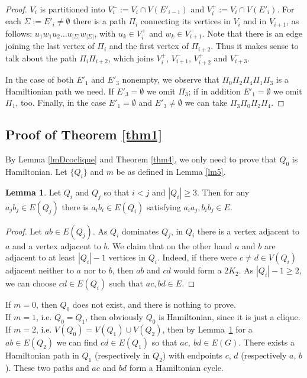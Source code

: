 \documentclass{amsart}
\theoremstyle{definition}
\newtheorem{lemma}{Lemma}
\begin{document}
\begin{proof}
$V_i$ is partitioned into
$V_i^-:= V_i\cap V(E'_{i-1})$ and 
$V_i^+:= V_i\cap V(E'_{i})$. For each $\Sigma:=E'_i\neq\emptyset$ there is
a path $\Pi_i$ connecting its vertices in $V_i$ and in $V_{i+1}$, 
as follows: $u_1 w_1 u_2\dots u_{|\Sigma|}w_{|\Sigma|}$, with 
$u_k\in V_i^+$ and $w_k\in V_{i+1}^-$.%
Note that there is an edge joining the last vertex of $\Pi_i$ and
the first vertex of $\Pi_{i+2}$. Thus it makes sense to talk about the path
$\Pi_i\Pi_{i+2}$, which joins $V_i^+$, $V_{i+1}^-$, $V_{i+2}^+$ and
$V_{i+3}^-$.

In the case of both $E'_1$ and $E'_3$ nonempty, we observe that 
$\Pi_0\Pi_2\Pi_4\Pi_1\Pi_3$ is a Hamiltionian path we need.
If $E'_3=\emptyset$  we omit $\Pi_3$; if in addition $E'_1=\emptyset$ 
we omit $\Pi_1$, too. Finally, in the case  $E'_1=\emptyset$ and 
$E'_3\neq\emptyset$ we can take $\Pi_3\Pi_0\Pi_2\Pi_4$.
\end{proof}

\subsection{Proof of Theorem \ref{thm1}}
By Lemma \ref{lmDcoclique} and Theorem \ref{thm4}, we only need to prove that $Q_0$ is Hamiltonian.
Let $\{Q_i\}$ and $m$ be as defined in Lemma \ref{lm5}.
\begin{lemma}\label{lem:twoQ}
Let $Q_i$ and $Q_j$ so that $i<j$ and $|Q_i|\geq 3$.
Then for any $a_j b_j\in E(Q_j)$  there is $a_i b_i\in E(Q_i)$ satisfying
$a_i a_j, b_i b_j\in E$.
\end{lemma}
\begin{proof}
Let $ab\in E(Q_j)$. As $Q_i$ dominates $Q_j$, in $Q_i$ there is a vertex adjacent to 
$a$ and a vertex adjacent to $b$.
We claim that on the other hand $a$ and $b$ are adjacent to at least $|Q_i|-1$ vertices in $Q_i$. 
Indeed, if there were $c\neq d\in V(Q_i)$ adjacent neither to $a$ nor to $b$, 
then $ab$ and $cd$ would form a $2K_2$.
As $|Q_i|-1\ge 2$, we can choose $cd\in E(Q_i)$ such that $ac, bd\in E$.
\end{proof}
 
If $m=0$, then $Q_0$ does not exist, and there is nothing to prove.\\
If $m=1$, i.e. $Q_0=Q_1$, then obviously $Q_0$ is Hamiltonian, since it is just a clique.\\
If $m=2$, i.e. $V(Q_0)=V(Q_1)\cup V(Q_2)$, then by Lemma~\ref{lem:twoQ} 
for a $ab\in E(Q_2)$ 
we can find $cd\in E(Q_1)$ so that $ac,~bd\in E(G)$. 
There exists a Hamiltonian path in  $Q_1$ (respectively in $Q_2$) 
with endpoints $c$, $d$ (respectively $a$, $b$).
These two paths and $ac$ and $bd$ form a Hamiltonian cycle.
\end{document}
